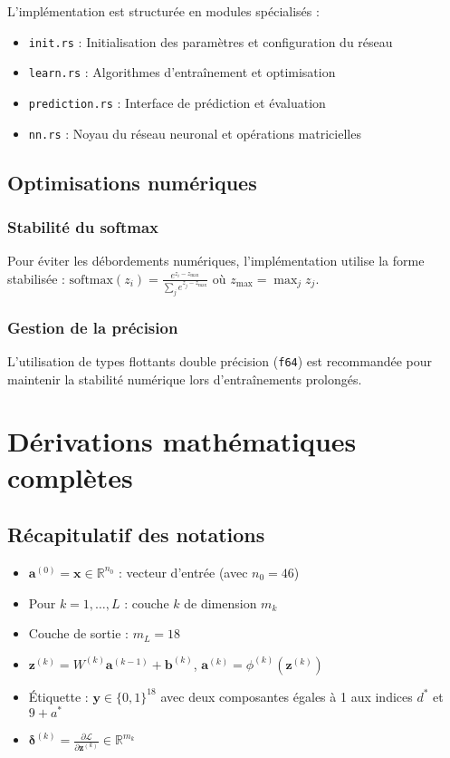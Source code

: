 \documentclass[12pt,a4paper]{report}
\numberwithin{equation}{section}
\begin{document}
L'implémentation est structurée en modules spécialisés :

\begin{itemize}
  \item \texttt{\color{primaryblue}init.rs} : Initialisation des paramètres et configuration du réseau
  \item \texttt{\color{primaryblue}learn.rs} : Algorithmes d'entraînement et optimisation
  \item \texttt{\color{primaryblue}prediction.rs} : Interface de prédiction et évaluation
  \item \texttt{\color{primaryblue}nn.rs} : Noyau du réseau neuronal et opérations matricielles
\end{itemize}

\section{Optimisations numériques}

\subsection{Stabilité du softmax}
Pour éviter les débordements numériques, l'implémentation utilise la forme stabilisée :
$\text{softmax}(z_i) = \frac{e^{z_i - z_{\max}}}{\sum_j e^{z_j - z_{\max}}}$
où $z_{\max} = \max_j z_j$.

\subsection{Gestion de la précision}
L'utilisation de types flottants double précision (\texttt{f64}) est recommandée pour maintenir la stabilité numérique lors d'entraînements prolongés.

\appendix

\chapter{Dérivations mathématiques complètes}

\section{Récapitulatif des notations}
\begin{itemize}
  \item $\mathbf{a}^{(0)} = \mathbf{x} \in \mathbb{R}^{n_0}$ : vecteur d'entrée (avec $n_0 = 46$)
  \item Pour $k = 1, \ldots, L$ : couche $k$ de dimension $m_k$
  \item Couche de sortie : $m_L = 18$
  \item $\mathbf{z}^{(k)} = W^{(k)} \mathbf{a}^{(k-1)} + \mathbf{b}^{(k)}$, $\mathbf{a}^{(k)} = \phi^{(k)}(\mathbf{z}^{(k)})$
  \item Étiquette : $\mathbf{y} \in \{0,1\}^{18}$ avec deux composantes égales à 1 aux indices $d^*$ et $9+a^*$
  \item $\boldsymbol{\delta}^{(k)} = \frac{\partial \mathcal{L}}{\partial \mathbf{z}^{(k)}} \in \mathbb{R}^{m_k}$
\end{itemize}
\end{document}
